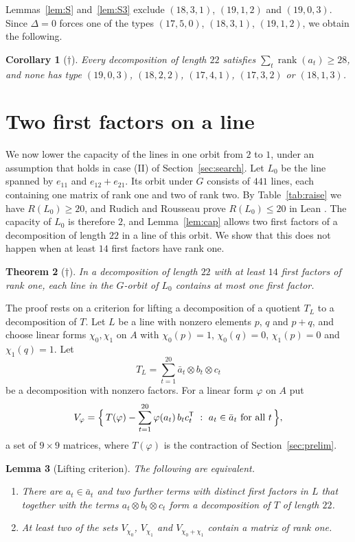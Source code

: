 \documentclass[11pt]{amsart}
\newtheorem{theorem}{Theorem}[section]
\newtheorem{lemma}[theorem]{Lemma}
\newtheorem{corollary}[theorem]{Corollary}
\theoremstyle{definition}
\theoremstyle{remark}
\numberwithin{equation}{section}
\newcommand{\rk}{\operatorname{rank}}
\begin{document}
Lemmas~\ref{lem:S} and~\ref{lem:S3} exclude $(18,3,1)$, $(19,1,2)$ and $(19,0,3)$. Since $\Delta=0$ forces one of the types $(17,5,0)$, $(18,3,1)$, $(19,1,2)$, we obtain the following.

\begin{corollary}[$\dagger$]\label{cor:types}
Every decomposition of length $22$ satisfies $\sum_t\rk(a_t)\ge 28$, and none has type $(19,0,3)$, $(18,2,2)$, $(17,4,1)$, $(17,3,2)$ or $(18,1,3)$.
\end{corollary}

\section{Two first factors on a line}\label{sec:l479}

We now lower the capacity of the lines in one orbit from $2$ to $1$, under an assumption that holds in case (II) of Section~\ref{sec:search}. Let $L_0$ be the line spanned by $e_{11}$ and $e_{12}+e_{21}$. Its orbit under $G$ consists of $441$ lines, each containing one matrix of rank one and two of rank two. By Table~\ref{tab:raise} we have $R(L_0)\ge 20$, and Rudich and Rousseau prove $R(L_0)\le 20$ in Lean \cite{RR26}. The capacity of $L_0$ is therefore $2$, and Lemma~\ref{lem:cap} allows two first factors of a decomposition of length $22$ in a line of this orbit. We show that this does not happen when at least $14$ first factors have rank one.

\begin{theorem}[$\dagger$]\label{thm:l479}
In a decomposition of length $22$ with at least $14$ first factors of rank one, each line in the $G$-orbit of $L_0$ contains at most one first factor.
\end{theorem}

The proof rests on a criterion for lifting a decomposition of a quotient $T_L$ to a decomposition of $T$. Let $L$ be a line with nonzero elements $p$, $q$ and $p+q$, and choose linear forms $\chi_0,\chi_1$ on $A$ with $\chi_0(p)=1$, $\chi_0(q)=0$, $\chi_1(p)=0$ and $\chi_1(q)=1$. Let
\[
T_L=\sum_{t=1}^{20}\bar a_t\otimes b_t\otimes c_t
\]
be a decomposition with nonzero factors. For a linear form $\varphi$ on $A$ put
\[
V_\varphi=\Bigl\{\,T(\varphi)-\sum_{t=1}^{20}\varphi(a_t)\,b_tc_t^{\mathsf T}\ :\ a_t\in\bar a_t\text{ for all }t\,\Bigr\},
\]
a set of $9\times 9$ matrices, where $T(\varphi)$ is the contraction of Section~\ref{sec:prelim}.

\begin{lemma}[Lifting criterion]\label{lem:lift}
The following are equivalent.
\begin{enumerate}[label=(\alph*)]
\item There are $a_t\in\bar a_t$ and two further terms with distinct first factors in $L$ that together with the terms $a_t\otimes b_t\otimes c_t$ form a decomposition of $T$ of length $22$.
\item At least two of the sets $V_{\chi_0}$, $V_{\chi_1}$ and $V_{\chi_0+\chi_1}$ contain a matrix of rank one.
\end{enumerate}
\end{lemma}
\end{document}
